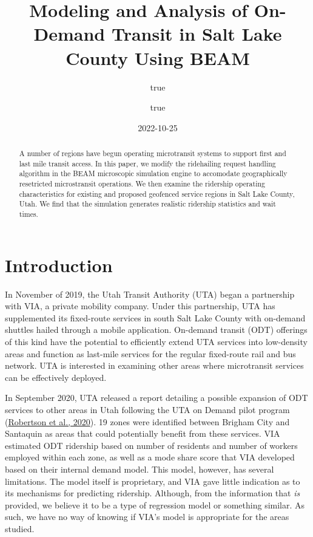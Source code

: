 \documentclass[
]{report}
\title{Modeling and Analysis of On-Demand Transit in Salt Lake County Using BEAM}
\author{true \and true}
\date{2022-10-25}
\begin{document}
\maketitle
\begin{abstract}
A number of regions have begun operating microtransit systems to support first and last mile transit access. In this paper, we modify the ridehailing request handling algorithm in the BEAM microscopic simulation engine to accomodate geographically resetricted microstransit operations. We then examine the ridership operating characteristics for existing and proposed geofenced service regions in Salt Lake County, Utah. We find that the simulation generates realistic ridership statistics and wait times.
\end{abstract}

{
\setcounter{tocdepth}{1}
\tableofcontents
}
\hypertarget{introduction}{%
\chapter{Introduction}\label{introduction}}

In November of 2019, the Utah Transit Authority (UTA) began a partnership with VIA, a private mobility company. Under this partnership, UTA has supplemented its fixed-route services in south Salt Lake County with on-demand shuttles hailed through a mobile application. On-demand transit (ODT) offerings of this kind have the potential to efficiently extend UTA services into low-density areas and function as last-mile services for the regular fixed-route rail and bus network. UTA is interested in examining other areas where microtransit services can be effectively deployed.

In September 2020, UTA released a report detailing a possible expansion of ODT services to other areas in Utah following the UTA on Demand pilot program (\protect\hyperlink{ref-UTAreport}{Robertson et al., 2020}). 19 zones were identified between Brigham City and Santaquin as areas that could potentially benefit from these services. VIA estimated ODT ridership based on number of residents and number of workers employed within each zone, as well as a mode share score that VIA developed based on their internal demand model. This model, however, has several limitations. The model itself is proprietary, and VIA gave little indication as to its mechanisms for predicting ridership. Although, from the information that \emph{is} provided, we believe it to be a type of regression model or something similar. As such, we have no way of knowing if VIA's model is appropriate for the areas studied.
\end{document}
